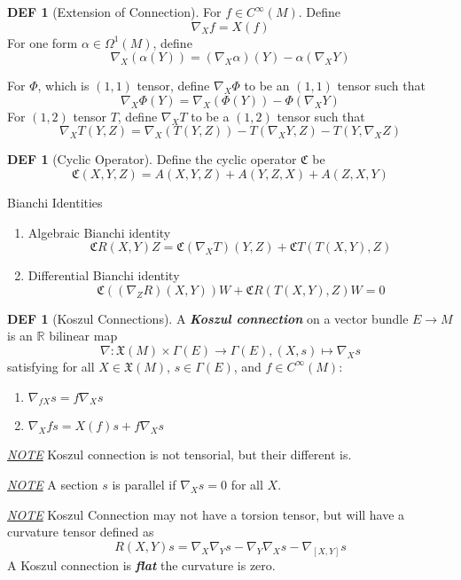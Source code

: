 \documentclass[twocolumn]{article}
\renewcommand{\emph}[1]{\textbf{\textit{#1}}}
\newcommand{\X}{\mathfrak{X}}
\newcommand{\n}{\nabla}
\newcommand{\R}{\mathbb{R}}
\newcommand{\C}{C^{\infty}}
\newcommand{\CY}{\mathfrak{C}}
\newcommand{\G}{\Gamma}
\newcommand{\N}{\textit{\underline{NOTE} }}
\newcommand{\W}{\Omega}
\theoremstyle{definition}
\newtheorem{defi}[thm]{DEF}
\begin{document}
\begin{defi}[Extension of Connection]
	For $f \in \C(M)$. Define 
	$$
		\n_X f = X(f)
	$$
	For one form $\alpha \in \W^1(M)$, define 
	$$
		\n_X(\alpha (Y)) = (\n_X \alpha)(Y) - \alpha(\n_X Y)
	$$

	For $\Phi$, which is $(1,1)$ tensor, define $\n_X \Phi$ to be an $(1,1)$ tensor such that 
	$$
		\n_X \Phi(Y) = \n_X(\Phi(Y)) - \Phi(\n_X Y)
	$$
	For $(1,2)$ tensor $T$, define $\n_X T$ to be a $(1,2)$ tensor such that
	$$
		\n_X T(Y, Z) = \n_X(T(Y, Z)) - T(\n_X Y, Z) - T(Y, \n_X Z)
	$$
\end{defi}

\begin{defi}[Cyclic Operator]
	Define the cyclic operator $\CY$ be 
	$$
		\CY(X, Y, Z) = A(X, Y, Z) + A(Y, Z, X) + A(Z, X, Y)
	$$
\end{defi}

\begin{fthm}{Bianchi Identities}{}
	\begin{enumerate}
		\item Algebraic Bianchi identity 
			$$
				\CY R(X, Y) Z = \CY(\n_X T)(Y, Z) + \CY T (T (X, Y),Z)
			$$
		\item Differential Bianchi identity 
			$$
				\CY((\n_Z R)(X, Y))W + \CY R(T(X, Y), Z)W = 0
			$$
	\end{enumerate}
\end{fthm}

\begin{defi}[Koszul Connections]
	A \emph{Koszul connection} on a vector bundle $E \rightarrow  M$ is an $\R$ bilinear map 
	$$
		\n: \X (M) \times \G(E) \to \G (E), (X,s) \mapsto \n_X s
	$$
	satisfying for all $X \in \X(M)$, $s \in \G(E)$, and $f \in \C(M)$: 
	\begin{enumerate}
		\item $\n_{fX} s = f \n_X s$
		\item $\n_{X} fs = X(f) s + f \n_X s$
	\end{enumerate}

\end{defi}

\N Koszul connection is not tensorial, but their different is.

\N A section $s$ is parallel if $\n_X s = 0$ for all $X$.

\N Koszul Connection may not have a torsion tensor, but will have a curvature tensor defined as 
$$
	R(X, Y)s = \n_X \n_Y s - \n_Y \n_X s - \n_{[X, Y]} s
$$
A Koszul connection is \emph{flat} the curvature is zero.
\end{document}
